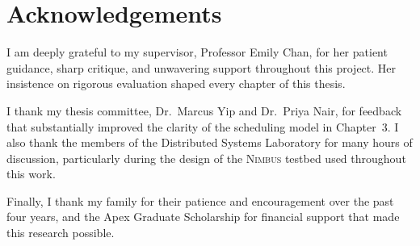 \chapter*{Acknowledgements}
\thispagestyle{plain}

I am deeply grateful to my supervisor, Professor Emily Chan, for her patient guidance, sharp critique, and unwavering support throughout this project. Her insistence on rigorous evaluation shaped every chapter of this thesis.

I thank my thesis committee, Dr.\ Marcus Yip and Dr.\ Priya Nair, for feedback that substantially improved the clarity of the scheduling model in Chapter~3. I also thank the members of the Distributed Systems Laboratory for many hours of discussion, particularly during the design of the \textsc{Nimbus} testbed used throughout this work.

Finally, I thank my family for their patience and encouragement over the past four years, and the Apex Graduate Scholarship for financial support that made this research possible.

\tableofcontents
\listoffigures
\listoftables

\clearpage
{}

